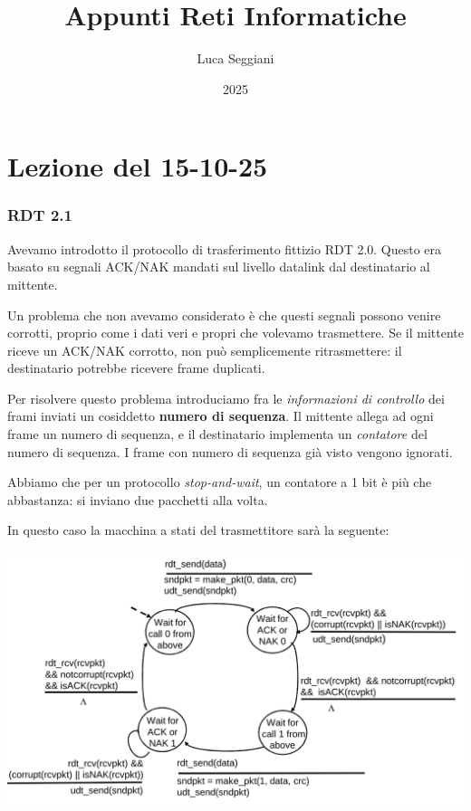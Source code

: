 \documentclass[a4paper,11pt]{article}
\title{Appunti Reti Informatiche}
\author{Luca Seggiani}
\date{2025}
\begin{document}
\section{Lezione del 15-10-25}

\thispagestyle{empty}
\pagestyle{fancy}

\subsubsection{RDT 2.1}
Avevamo introdotto il protocollo di trasferimento fittizio RDT 2.0.
Questo era basato su segnali ACK/NAK mandati sul livello datalink dal destinatario al mittente.

Un problema che non avevamo considerato è che questi segnali possono venire corrotti, proprio come i dati veri e propri che volevamo trasmettere.
Se il mittente riceve un ACK/NAK corrotto, non può semplicemente ritrasmettere: il destinatario potrebbe ricevere frame duplicati.

Per risolvere questo problema introduciamo fra le \textit{informazioni di controllo} dei frami inviati un cosiddetto \textbf{numero di sequenza}.
Il mittente allega ad ogni frame un numero di sequenza,
e il destinatario implementa un \textit{contatore} del numero di sequenza.
I frame con numero di sequenza già visto vengono ignorati.

Abbiamo che per un protocollo \textit{stop-and-wait}, un contatore a 1 bit è più che abbastanza: si inviano due pacchetti alla volta.

\newpage

In questo caso la macchina a stati del trasmettitore sarà la seguente:
\begin{center}
	\includegraphics[scale=0.25]{../figures/rdt21fsm.png}
\end{center}
\end{document}
